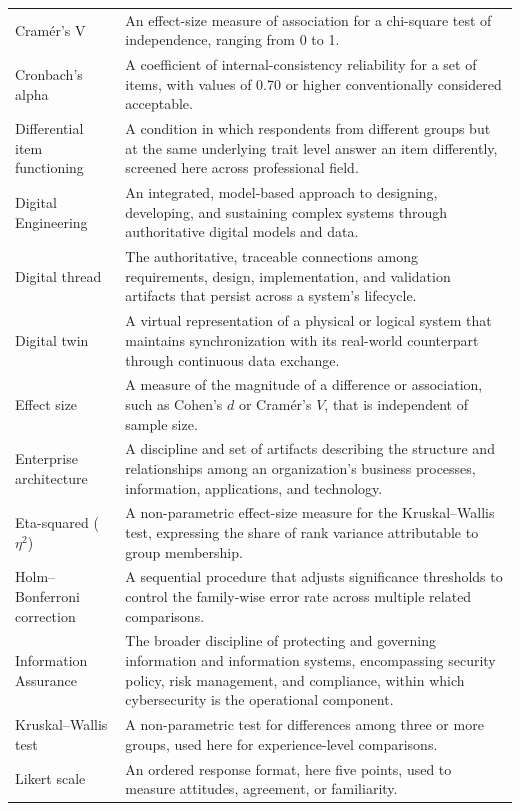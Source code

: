 \begin{singlespace}
\begin{longtable}{p{} p{}}
Cram\'er's V & An effect-size measure of association for a chi-square test of independence, ranging from 0 to 1. \\
Cronbach's alpha & A coefficient of internal-consistency reliability for a set of items, with values of 0.70 or higher conventionally considered acceptable. \\
Differential item functioning & A condition in which respondents from different groups but at the same underlying trait level answer an item differently, screened here across professional field. \\
Digital Engineering & An integrated, model-based approach to designing, developing, and sustaining complex systems through authoritative digital models and data. \\
Digital thread & The authoritative, traceable connections among requirements, design, implementation, and validation artifacts that persist across a system's lifecycle. \\
Digital twin & A virtual representation of a physical or logical system that maintains synchronization with its real-world counterpart through continuous data exchange. \\
Effect size & A measure of the magnitude of a difference or association, such as Cohen's $d$ or Cram\'er's $V$, that is independent of sample size. \\
Enterprise architecture & A discipline and set of artifacts describing the structure and relationships among an organization's business processes, information, applications, and technology. \\
Eta-squared ($\eta^2$) & A non-parametric effect-size measure for the Kruskal--Wallis test, expressing the share of rank variance attributable to group membership. \\
Holm--Bonferroni correction & A sequential procedure that adjusts significance thresholds to control the family-wise error rate across multiple related comparisons. \\
Information Assurance & The broader discipline of protecting and governing information and information systems, encompassing security policy, risk management, and compliance, within which cybersecurity is the operational component. \\
Kruskal--Wallis test & A non-parametric test for differences among three or more groups, used here for experience-level comparisons. \\
Likert scale & An ordered response format, here five points, used to measure attitudes, agreement, or familiarity. \\

\end{longtable}
\end{singlespace}
